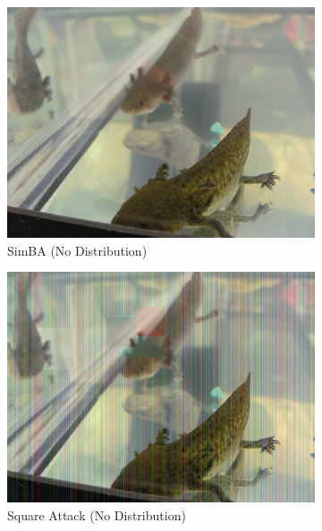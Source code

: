 \begin{figure}[tp]
\centering
\begin{subfigure}[t]{0.31\textwidth}
    \centering
    \includegraphics[width=\textwidth]{figures/chapter_classification/x_29_adv_simba_1.jpg}
    \caption{SimBA (No Distribution)}
    \label{fig:simba_no_img}
\end{subfigure}
\hfill
\begin{subfigure}[t]{0.31\textwidth}
    \centering
    \includegraphics[width=\textwidth]{figures/chapter_classification/x_29_adv_square_1.jpg}
    \caption{Square Attack (No Distribution)}
    \label{fig:square_no_img}
\end{subfigure}
\hfill
\begin{subfigure}[t]{0.31\textwidth}

\end{subfigure}
\end{figure}
